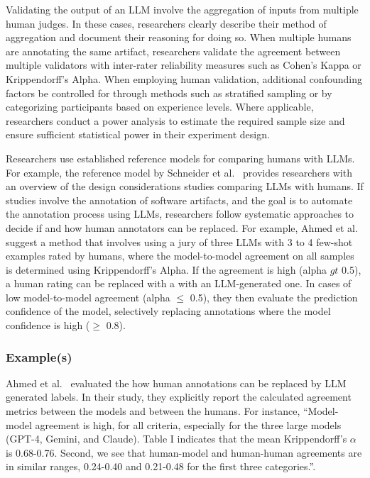 Validating the output of an LLM \may involve the aggregation of inputs from multiple human judges.
In these cases, researchers \should clearly describe their method of aggregation and document their reasoning for doing so.
When multiple humans are annotating the same artifact, researchers \should validate the agreement between multiple validators with inter-rater reliability measures such as Cohen's Kappa or Krippendorff's Alpha.
When employing human validation, additional confounding factors \should be controlled for through methods such as stratified sampling or by categorizing participants based on experience levels.
Where applicable, researchers \should conduct a power analysis to estimate the required sample size and ensure sufficient statistical power in their experiment design.

Researchers \should use established reference models for comparing humans with LLMs.
For example, the reference model by Schneider et al.~\cite{Schneider2025ReferenceModel} provides researchers with an overview of the design considerations studies comparing LLMs with humans.
If studies involve the annotation of software artifacts, and the goal is to automate the annotation process using LLMs, researchers \should follow systematic approaches to decide if and how human annotators can be replaced.
For example, Ahmed et al.~\cite{DBLP:journals/corr/abs-2408-05534} suggest a method that involves using a jury of three LLMs with 3 to 4 few-shot examples rated by humans, where the model-to-model agreement on all samples is determined using Krippendorff's Alpha.
If the agreement is high (alpha $gt$ 0.5), a human rating can be replaced with a with an LLM-generated one.
In cases of low model-to-model agreement (alpha $\le$ 0.5), they then evaluate the prediction confidence of the model, selectively replacing annotations where the model confidence is high ($\ge$ 0.8).


\subsubsection{Example(s)}

Ahmed et al.~\cite{DBLP:journals/corr/abs-2408-05534} evaluated the how human annotations can be replaced by LLM generated labels.
In their study, they explicitly report the calculated agreement metrics between the models and between the humans.
For instance, ``Model-model agreement is high, for all criteria, especially for the three large models (GPT-4, Gemini, and Claude). Table I indicates that the mean Krippendorff’s $\alpha$ is 0.68-0.76. 
Second, we see that human-model and human-human agreements are in similar ranges, 0.24-0.40 and 0.21-0.48
for the first three categories.''.

